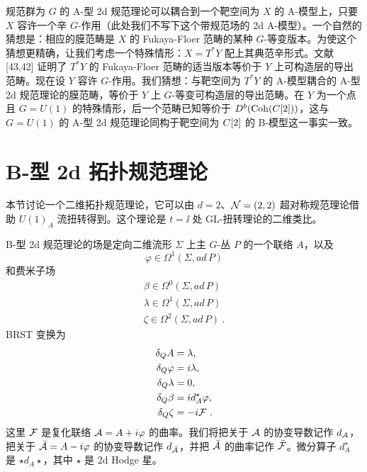 
规范群为 $G$ 的 A-型 2d 规范理论可以耦合到一个靶空间为 $X$ 的 A-模型上，只要 $X$ 容许一个辛 $G$-作用（此处我们不写下这个带规范场的 2d A-模型）。一个自然的猜想是：相应的膜范畴是 $X$ 的 Fukaya-Floer 范畴的某种 $G$-等变版本。为使这个猜想更精确，让我们考虑一个特殊情形：$X=T^*Y$ 配上其典范辛形式。文献 [43,42] 证明了 $T^*Y$ 的 Fukaya-Floer 范畴的适当版本等价于 $Y$ 上可构造层的导出范畴。现在设 $Y$ 容许 $G$-作用。我们猜想：与靶空间为 $T^*Y$ 的 A-模型耦合的 A-型 2d 规范理论的膜范畴，等价于 $Y$ 上 $G$-等变可构造层的导出范畴。在 $Y$ 为一个点且 $G=U(1)$ 的特殊情形，后一个范畴已知等价于 $D^b(\operatorname{Coh}(C[2]))$，这与 $G=U(1)$ 的 A-型 2d 规范理论同构于靶空间为 $C[2]$ 的 B-模型这一事实一致。


\section{B-型 2d 拓扑规范理论}

本节讨论一个二维拓扑规范理论，它可以由 $d=2$、$\mathcal{N}=(2,2)$ 超对称规范理论借助 $U(1)_A$ 流扭转得到。这个理论是 $t=\ii$ 处 GL-扭转理论的二维类比。

B-型 2d 规范理论的场是定向二维流形 $\Sigma$ 上主 $G$-丛 $P$ 的一个联络 $A$，以及
\[ \varphi \in \Omega^1(\Sigma, ad\,P) \]
和费米子场
\begin{gather*}
\beta \in \Omega^0(\Sigma, ad\,P) \\
\lambda \in \Omega^1(\Sigma, ad\,P) \\
\zeta \in \Omega^2(\Sigma, ad\,P) \ .
\end{gather*}
BRST 变换为
\begin{align*}
\delta_QA &= \lambda, \\
\delta_Q\varphi &= i\lambda, \\
\delta_Q\lambda &= 0, \\
\delta_Q\beta &= i d_A^{\star}\varphi, \\
\delta_Q\zeta &= -i\mathcal{F} \ .
\end{align*}
这里 $\mathcal{F}$ 是复化联络 $\mathcal{A}=A+i\varphi$ 的曲率。我们将把关于 $\mathcal{A}$ 的协变导数记作 $d_{\mathcal{A}}$，把关于 $\bar{\mathcal{A}}=A-i\varphi$ 的协变导数记作 $d_{\bar{\mathcal{A}}}$，并把 $\bar{\mathcal{A}}$ 的曲率记作 $\bar{\mathcal{F}}$。微分算子 $d_A^{\star}$ 是 $\star d_A\star$，其中 $\star$ 是 2d Hodge 星。


